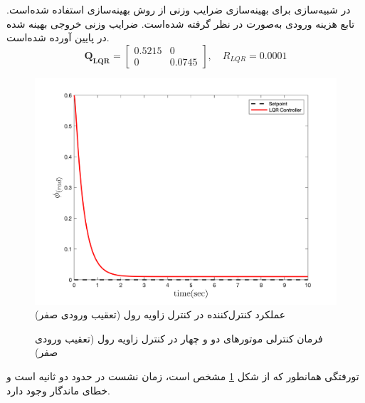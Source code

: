 %
%
% 
% 
  در شبیه‌سازی برای بهینه‌سازی ضرایب وزنی  از روش بهینه‌سازی
 \cite{Karimi2010}
استفاده شده‌است.
تابع هزینه ورودی  به‌صورت
در نظر گرفته شده‌است. ضرایب وزنی خروجی بهینه شده در پایین آورده شده‌است.
\begin{equation}
	\boldsymbol{Q_{LQR}} = \begin{bmatrix}
		0.5215 & 0\\
		0 & 0.0745
	\end{bmatrix}, \quad R_{LQR} =  0.0001
\end{equation} 
\begin{figure}[H]
	\includegraphics[width=.48\linewidth]{../Figures/MIL/LQR/Roll/lqr_roll_nn.png}
	\centering
	\caption{عملكرد کنترل‌کننده  در کنترل زاويه رول (تعقیب ورودی صفر)}
	\label{lqr_roll_figure_simulation}
\end{figure}
\begin{figure}[H]
	\centering
	\caption{‫‪فرمان کنترلی موتورهای دو و چهار در کنترل زاویه رول (تعقیب ورودی صفر)}
\end{figure}
‌تورفتگی همانطور که از شکل
\ref{lqr_roll_figure_simulation}
مشخص است، زمان نشست در حدود دو ثانیه است و خطای ماندگار وجود دارد.